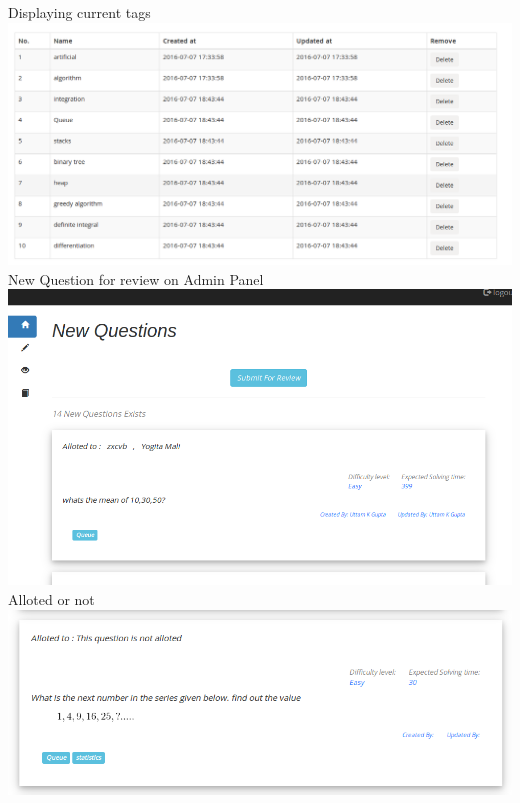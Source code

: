 \documentclass[a4paper,12pt,oneside]{book}
\begin{document}
\vspace{2in}
Displaying current tags \\
\includegraphics[scale=0.3]{tags2.png}	\\

\vspace{0.7in}
New Question for review on Admin Panel \\
\includegraphics[scale=0.35]{newquestions.png}	\\

\vspace{2in}
Alloted or not \\
\includegraphics[scale=0.45]{alloted_unalloted.png}	\\
\end{document}
